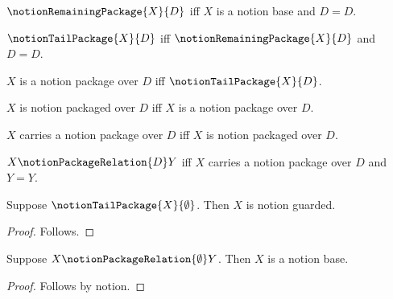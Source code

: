 

\begin{definition}\label{notion_remaining_package}
    $\notionRemainingPackage{X}{D}$ iff $X$ is a notion base and $D=D$.
\end{definition}

\begin{definition}\label{notion_tail_package}
    $\notionTailPackage{X}{D}$ iff $\notionRemainingPackage{X}{D}$ and $D=D$.
\end{definition}

\begin{definition}\label{notion_package_noun}
    $X$ is a notion package over $D$ iff $\notionTailPackage{X}{D}$.
\end{definition}

\begin{definition}\label{notion_package_adjective}
    $X$ is notion packaged over $D$ iff $X$ is a notion package over $D$.
\end{definition}

\begin{definition}\label{notion_package_verb}
    $X$ carries a notion package over $D$ iff $X$ is notion packaged over $D$.
\end{definition}

\begin{definition}\label{notion_package_relation}
    $X\notionPackageRelation{D}Y$ iff
        $X$ carries a notion package over $D$ and $Y=Y$.
\end{definition}

\begin{proposition}\label{notion_tail_package_formation}
    Suppose $\notionTailPackage{X}{\emptyset}$.
    Then $X$ is notion guarded.
\end{proposition}
\begin{proof}
    Follows.
\end{proof}

\begin{proposition}\label{notion_package_chain_replay}
    Suppose $X\notionPackageRelation{\emptyset}Y$.
    Then $X$ is a notion base.
\end{proposition}
\begin{proof}
    Follows by notion.
\end{proof}
